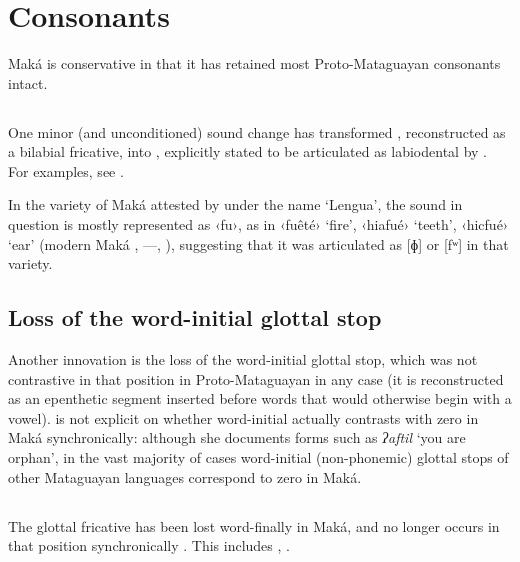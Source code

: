 \section{Consonants}\label{mk-cons}
Maká is conservative in that it has retained most Proto-Mataguayan consonants intact.

\subsection{}\label{mk-f}

One minor (and unconditioned) sound change has transformed , reconstructed as a bilabial fricative, into , explicitly stated to be articulated as labiodental by \citet[30]{AG89}. For examples, see .

In the variety of Maká attested by \citet[456]{AD60} under the name `Lengua', the sound in question is mostly represented as ‹fu›, as in ‹fuêté› `fire', ‹hiafué› `teeth', ‹hicfué› `ear' (modern Maká , ---, ), suggesting that it was articulated as [ɸ] or [fʷ] in that variety.

\subsection{Loss of the word-initial glottal stop}\label{mk-onsetless}

Another innovation is the loss of the word-initial glottal stop, which was not contrastive in that position in Proto-Mataguayan in any case (it is reconstructed as an epenthetic segment inserted before words that would otherwise begin with a vowel). \citet[26–27, 49]{AG89} is not explicit on whether word-initial  actually contrasts with zero in Maká synchronically: although she documents forms such as \textit{ʔaftil} `you are orphan', in the vast majority of cases word-initial (non-phonemic) glottal stops of other Mataguayan languages correspond to zero in Maká.

\subsection{}\label{mk-h}

The glottal fricative  has been lost word-finally in Maká, and  no longer occurs in that position synchronically \citep[34]{AG89}. This includes , .

\begin{exe}
    \ex \plaj
    \ex \distal
    \ex \companion \label{mk-h-companion}
    \ex \neighbor \label{mk-h-neighbor}
    \ex \goimp
    \ex \soul
    \ex \hornero
    \ex \recipient
    \ex \lessergrison
\end{exe}

